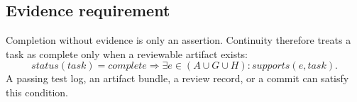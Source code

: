 \subsection{Evidence requirement}

Completion without evidence is only an assertion. Continuity therefore treats a task as complete only when a reviewable artifact exists:
\begin{equation}
\label{eq:evidence}
status(task)=complete \Rightarrow \exists e\in(A\cup G\cup H): supports(e,task).
\end{equation}
A passing test log, an artifact bundle, a review record, or a commit can satisfy this condition.
